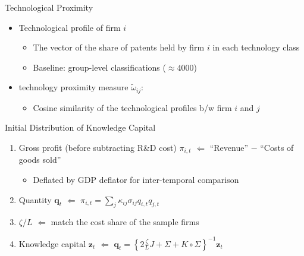 \documentclass[
  aspectratio=169,  %
]{beamer}
\theoremstyle{plain}
\begin{document}
\begin{frame}{Technological Proximity}
  \begin{itemize}
    \item Technological profile of firm $i$
          \begin{itemize}
            \item The vector of the share of patents held by firm
            $i$ in each technology class
            \item Baseline: group-level classifications ($\approx4000$)\medskip{}
          \end{itemize}
          \medskip{}
    \item \citet{Jaffe1986-yz} technology proximity measure $\tilde{\omega}_{ij}$:
      \begin{itemize}
      \item Cosine similarity of the technological profiles b/w firm $i$ and $j$
      \end{itemize}
  \end{itemize}
\end{frame}

%
\begin{frame}{Initial Distribution of Knowledge Capital}
  \begin{enumerate}
    \item Gross profit (before subtracting R\&D cost) $\pi_{i,t}$ $\Longleftarrow$
          ``Revenue'' $-$ ``Costs of goods sold''
          \begin{itemize}
            \item Deflated by GDP deflator for inter-temporal comparison\medskip{}
          \end{itemize}
    \item Quantity $\symbf{q}_{t}$ $\Longleftarrow$ $\pi_{i,t}=\sum_{j}\kappa_{ij}\sigma_{ij}q_{i,t}q_{j,t}$\medskip{}
    \item $\zeta/L$ $\Longleftarrow$ match the cost share of the sample firms\medskip{}
    \item Knowledge capital $\symbf{z}_{t}$ $\Longleftarrow$ $\symbf{q}_{t}=\left\{ 2\frac{\zeta}{L}J+\Sigma+K\circ\Sigma\right\} ^{-1}\symbf{z}_{t}$
  \end{enumerate}
\end{frame}
\end{document}
